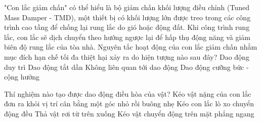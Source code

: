\begin{ex}	"Con lắc giảm chấn" có thể hiểu là bộ giảm chấn khối lượng điều chỉnh (Tuned Mass Damper - TMD), một thiết bị có khối lượng lớn được treo trong các công trình cao tầng để chống lại rung lắc do gió hoặc động đất. Khi công trình rung lắc, con lắc sẽ dịch chuyển theo hướng ngược lại để hấp thụ động năng và giảm biên độ rung lắc của tòa nhà. Nguyên tắc hoạt động của con lắc giảm chấn nhằm mục đích hạn chế tối đa thiệt hại xảy ra do hiện tượng nào sau đây?
	\choice
	{Dao động duy trì}
	{Dao động tắt dần}
	{Không liên quan tới dao động}
	{\True Dao động cưỡng bức - cộng hưởng}
\end{ex}

\begin{ex}	Thí nghiệm nào tạo được dao động điều hòa của vật?
	\choice
	{\True Kéo vật nặng của con lắc đơn ra khỏi vị trí cân bằng một góc nhỏ rồi buông nhẹ}
	{Kéo con lắc lò xo chuyển động đều}
	{Thả vật rơi từ trên xuống}
	{Kéo vật chuyển động trên mặt phẳng ngang}
\end{ex}

